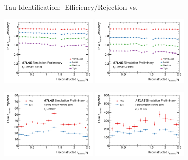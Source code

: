 \documentclass[11pt, xcolor={dvipsnames}, aspectratio=169, notes]{beamer}
\begin{document}
\begin{frame}{Tau Identification:\ Efficiency/Rejection vs.\ \allbold{$\eta$}}
  \centering

  \includegraphics[width=0.35\textwidth]{tauid/pubnote/eff_vs_eta_1p}%
  \includegraphics[width=0.35\textwidth]{tauid/pubnote/eff_vs_eta_3p}%

  \includegraphics[width=0.35\textwidth]{tauid/pubnote/rej_vs_eta_1p}%
  \includegraphics[width=0.35\textwidth]{tauid/pubnote/rej_vs_eta_3p}%
\end{frame}

\end{document}
